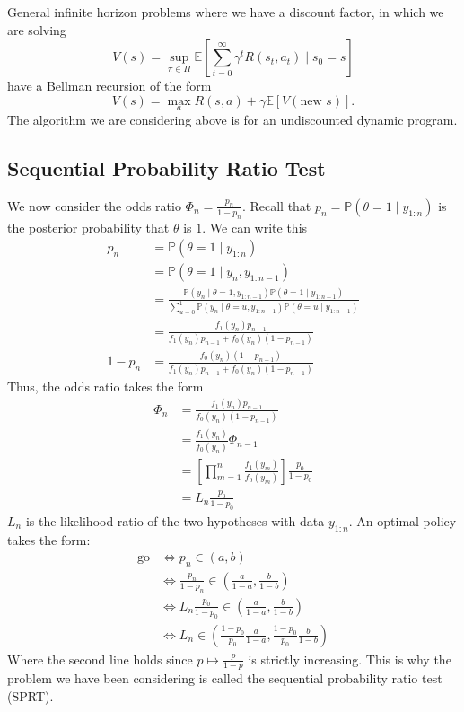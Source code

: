 \documentclass[pdftex,letterpaper,11pt]{article}
\theoremstyle{definition}
\theoremstyle{definition}
\theoremstyle{definition}
\newcommand{\PP}{\mathbb P}
\newcommand{\EE}{\mathbb E}
\newcommand{\mrm}[1]{\mathrm{#1}}
\begin{document}
General infinite horizon problems where we have a discount factor, in which we are solving
\[V(s) = \sup_{\pi \in \Pi} \EE\left[\sum_{t=0}^\infty \gamma^t R(s_t, a_t) \mid s_0 = s \right]\]
have a Bellman recursion of the form
\[V(s) = \max_a R(s, a) + \gamma \EE[V(\mbox{new $s$})].\]
The algorithm we are considering above is for an undiscounted dynamic program.

\subsection*{Sequential Probability Ratio Test}

We now consider the odds ratio $\Phi_n = \frac{p_n}{1-p_n}$. Recall that $p_n = \PP(\theta=1 \mid y_{1:n})$ is the posterior probability that $\theta$ is $1$. We can write this
\begin{align*}
	p_n & = \PP(\theta = 1 \mid y_{1:n})\\
		& = \PP(\theta = 1 \mid y_n, y_{1:n-1})\\
		& = \frac{\PP(y_n \mid \theta=1, y_{1:n-1}) \PP(\theta=1 \mid y_{1:n-1})}{\sum_{u=0}^1 \PP(y_n \mid \theta=u, y_{1:n-1})\PP(\theta=u\mid y_{1:n-1})}\\
		& = \frac{f_1(y_n) p_{n-1}}{f_1(y_n)p_{n-1} + f_0(y_n)(1-p_{n-1})}\\
		1-p_n & =  \frac{f_0(y_n) (1-p_{n-1})}{f_1(y_n)p_{n-1} + f_0(y_n)(1-p_{n-1})}
\end{align*}
Thus, the odds ratio takes the form
\begin{align*}
	\Phi_n & = \frac{f_1(y_n)p_{n-1}}{f_0(y_n)(1-p_{n-1})}\\
	& = \frac{f_1(y_n)}{f_0(y_n)} \Phi_{n-1}\\
	& = \left[ \prod_{m=1}^n \frac{f_1(y_m)}{f_0(y_m)} \right] \frac{p_0}{1-p_0}\\
	& = L_n \frac{p_0}{1-p_0}
\end{align*}
$L_n$ is the likelihood ratio of the two hypotheses with data $y_{1:n}$. An optimal policy takes the form:
\begin{align*}
	\mrm{go} & \iff p_n \in (a,b)\\
			 & \iff \frac{p_n}{1-p_n} \in \left(\frac{a}{1-a},\frac{b}{1-b}\right)\\
			 & \iff	L_n \frac{p_0}{1-p_0} \in \left(\frac{a}{1-a}, \frac{b}{1-b}\right)\\
			 & \iff L_n \in \left(\frac{1-p_0}{p_0}\frac{a}{1-a}, \frac{1-p_0}{p_0}\frac{b}{1-b} \right)
\end{align*}
Where the second line holds since $p \mapsto \frac{p}{1-p}$ is strictly increasing. This is why the problem we have been considering is called the sequential probability ratio test (SPRT).
\end{document}
